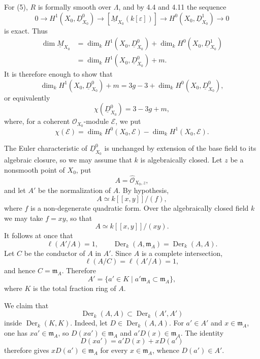 For (5), $R$ is formally smooth over $\Lambda$, and by 4.4 and 4.11
the sequence
\[
0\longrightarrow H^1(X_0,\underline D^0_{X_0})
 \longrightarrow[\underline M_{X_0}(k[\varepsilon])]
 \longrightarrow H^0(X_0,\underline D^1_{X_0})
 \longrightarrow0
\]
is exact. Thus
\[
\begin{aligned}
\dim\underline M_{X_0}
&=\dim_kH^1(X_0,\underline D^0_{X_0})
 +\dim_kH^0(X_0,\underline D^1_{X_0})\\
&=\dim_kH^1(X_0,\underline D^0_{X_0})+m.
\end{aligned}
\]
It is therefore enough to show that
\[
\dim_kH^1(X_0,\underline D^0_{X_0})+m
=3g-3+\dim_kH^0(X_0,\underline D^0_{X_0}),
\]
or equivalently
\[
\chi(\underline D^0_{X_0})=3-3g+m,
\]
where, for a coherent $\mathcal O_{X_0}$-module $\mathcal E$, we put
\[
\chi(\mathcal E)
=\dim_kH^0(X_0,\mathcal E)-\dim_kH^1(X_0,\mathcal E).
\]

The Euler characteristic of $\underline D^0_{X_0}$ is unchanged by
extension of the base field to its algebraic closure, so we may assume
that $k$ is algebraically closed. Let $z$ be a nonsmooth point of
$X_0$, put
\[
A=\widehat{\mathcal O}_{X_0,z},
\]
and let $A'$ be the normalization of $A$. By hypothesis,
\[
A\simeq k[[x,y]]/(f),
\]
where $f$ is a non-degenerate quadratic form. Over the algebraically
closed field $k$ we may take $f=xy$, so that
\[
A\simeq k[[x,y]]/(xy).
\]
It follows at once that
\[
\ell(A'/A)=1,
\qquad
\operatorname{Der}_k(A,\mathfrak m_A)
=\operatorname{Der}_k(A,A).
\]
Let $C$ be the conductor of $A$ in $A'$. Since $A$ is a complete
intersection,
\[
\ell(A/C)=\ell(A'/A)=1,
\]
and hence $C=\mathfrak m_A$. Therefore
\[
A'=\{a'\in K\mid a'\mathfrak m_A\subset\mathfrak m_A\},
\]
where $K$ is the total fraction ring of $A$.

We claim that
\[
\operatorname{Der}_k(A,A)
 \subset\operatorname{Der}_k(A',A')
\]
inside $\operatorname{Der}_k(K,K)$. Indeed, let
$D\in\operatorname{Der}_k(A,A)$. For $a'\in A'$ and
$x\in\mathfrak m_A$, one has $xa'\in\mathfrak m_A$, so
$D(xa')\in\mathfrak m_A$ and
$a'D(x)\in\mathfrak m_A$. The identity
\[
D(xa')=a'D(x)+xD(a')
\]
therefore gives $xD(a')\in\mathfrak m_A$ for every
$x\in\mathfrak m_A$, whence $D(a')\in A'$.


